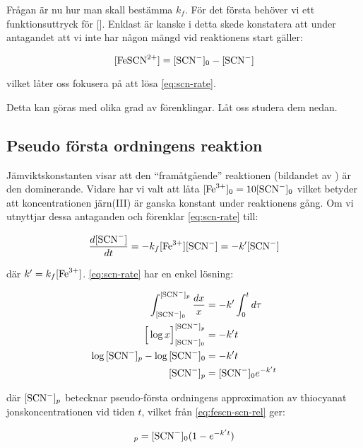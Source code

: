 Frågan är nu hur man skall bestämma $k_f$. För det första behöver vi ett funktionsuttryck
för []. Enklast är kanske i detta skede konstatera att under antagandet att
vi inte har någon mängd  vid reaktionens start gäller:

\begin{equation}
  \label{eq:fescn-scn-rel}
  [\ce{FeSCN^2+}] = [\ce{SCN-}]_0 - [\ce{SCN-}]
\end{equation}

vilket låter oss fokusera på att lösa \cref{eq:scn-rate}.

Detta kan göras med olika grad av förenklingar. Låt oss studera dem nedan.

\subsection{Pseudo första ordningens reaktion}
Jämviktskonstanten visar att den ``framåtgående'' reaktionen (bildandet av )
är den dominerande. Vidare har vi valt att låta $[\ce{Fe^3+}]_0=10[\ce{SCN-}]_0$ vilket
betyder att koncentrationen järn(III) är ganska konstant under reaktionens gång. Om vi
utnyttjar dessa antaganden och förenklar \cref{eq:scn-rate} till:

\begin{equation}
  \label{eq:scn-pseudo-rate}
  \frac{d[\ce{SCN-}]}{dt} = -k_f[\ce{Fe^3+}][\ce{SCN-}] = -k'[\ce{SCN-}] \\
\end{equation}

där $k' = k_f[\ce{Fe^3+}]$. \cref{eq:scn-rate} har en enkel lösning:

\begin{align}
  \int_{[\ce{SCN-}]_0}^{[\ce{SCN-}]_{p}} \frac{dx}{x} &= -k'\int_0^{t}d\tau \\
  \Big[ \log{x} \Big]_{[\ce{SCN-}]_0}^{[\ce{SCN-}]_{p}} &= -k't \\
  \log{[\ce{SCN-}]_{p}} - \log{[\ce{SCN-}]_{0}} &= -k't\\
  [\ce{SCN-}]_{p} &= [\ce{SCN-}]_0e^{-k't}
\end{align}

där $[\ce{SCN-}]_{p}$ betecknar pseudo-första ordningens approximation
av thiocyanat jonskoncentrationen vid tiden $t$, vilket från \cref{eq:fescn-scn-rel}
ger:

\begin{equation}
  [\ce{FeSCN^2+}]_{p}=[\ce{SCN-}]_0(1 - e^{-k't})
\end{equation}

